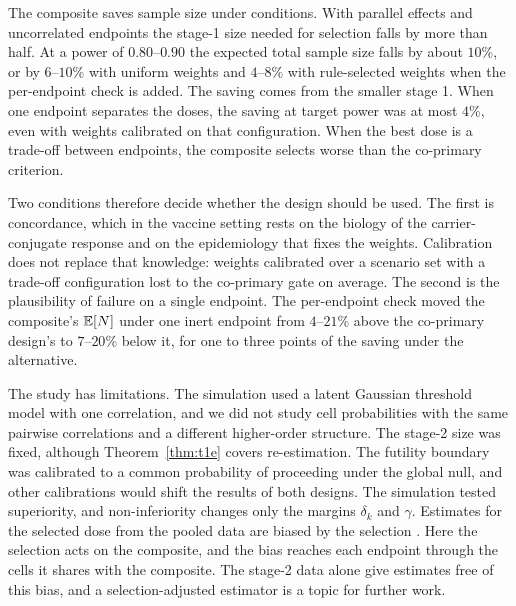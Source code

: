 The composite saves sample size under conditions. With parallel effects and uncorrelated endpoints the stage-1 size needed for selection falls by more than half. At a power of $0.80$--$0.90$ the expected total sample size falls by about $10$\%, or by $6$--$10$\% with uniform weights and $4$--$8$\% with rule-selected weights when the per-endpoint check is added. The saving comes from the smaller stage 1. When one endpoint separates the doses, the saving at target power was at most $4$\%, even with weights calibrated on that configuration. When the best dose is a trade-off between endpoints, the composite selects worse than the co-primary criterion.

Two conditions therefore decide whether the design should be used. The first is concordance, which in the vaccine setting rests on the biology of the carrier-conjugate response and on the epidemiology that fixes the weights. Calibration does not replace that knowledge: weights calibrated over a scenario set with a trade-off configuration lost to the co-primary gate on average. The second is the plausibility of failure on a single endpoint. The per-endpoint check moved the composite's $\mathbb{E}[N]$ under one inert endpoint from $4$--$21$\% above the co-primary design's to $7$--$20$\% below it, for one to three points of the saving under the alternative.

The study has limitations. The simulation used a latent Gaussian threshold model with one correlation, and we did not study cell probabilities with the same pairwise correlations and a different higher-order structure. The stage-2 size was fixed, although Theorem~\ref{thm:t1e} covers re-estimation. The futility boundary was calibrated to a common probability of proceeding under the global null, and other calibrations would shift the results of both designs. The simulation tested superiority, and non-inferiority changes only the margins $\delta_k$ and $\gamma$. Estimates for the selected dose from the pooled data are biased by the selection \citep{bowden2008,kimani2013}. Here the selection acts on the composite, and the bias reaches each endpoint through the cells it shares with the composite. The stage-2 data alone give estimates free of this bias, and a selection-adjusted estimator is a topic for further work.
